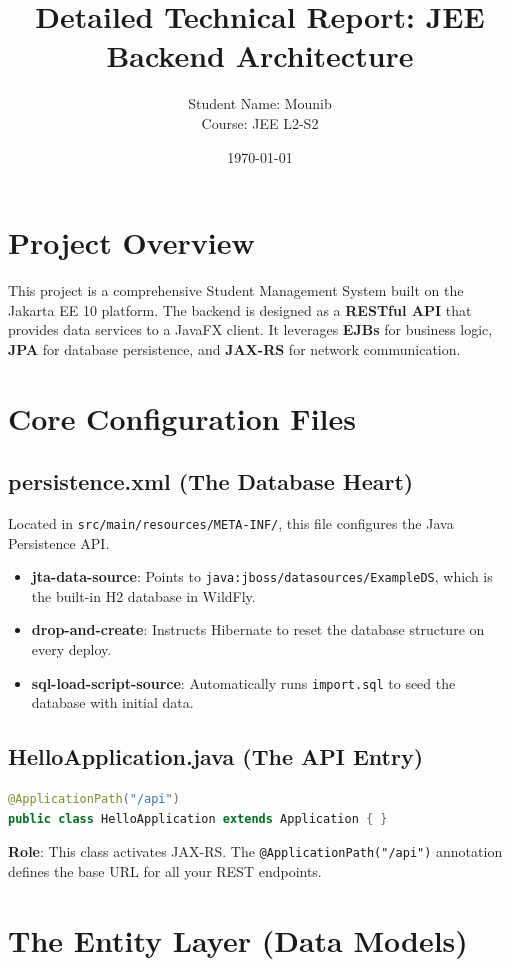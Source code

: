 \documentclass[12pt,a4paper]{article}
\title{\textbf{Detailed Technical Report: JEE Backend Architecture}}
\author{Student Name: Mounib \\ Course: JEE L2-S2}
\date{\today}
\begin{document}
\maketitle
\tableofcontents
\newpage

\section{Project Overview}
This project is a comprehensive Student Management System built on the Jakarta EE 10 platform. The backend is designed as a \textbf{RESTful API} that provides data services to a JavaFX client. It leverages \textbf{EJBs} for business logic, \textbf{JPA} for database persistence, and \textbf{JAX-RS} for network communication.

\section{Core Configuration Files}

\subsection{persistence.xml (The Database Heart)}
Located in \texttt{src/main/resources/META-INF/}, this file configures the Java Persistence API.
\begin{itemize}
    \item \textbf{jta-data-source}: Points to \texttt{java:jboss/datasources/ExampleDS}, which is the built-in H2 database in WildFly.
    \item \textbf{drop-and-create}: Instructs Hibernate to reset the database structure on every deploy.
    \item \textbf{sql-load-script-source}: Automatically runs \texttt{import.sql} to seed the database with initial data.
\end{itemize}

\subsection{HelloApplication.java (The API Entry)}
\begin{lstlisting}[language=Java]
@ApplicationPath("/api")
public class HelloApplication extends Application { }
\end{lstlisting}
\textbf{Role}: This class activates JAX-RS. The \texttt{@ApplicationPath("/api")} annotation defines the base URL for all your REST endpoints.

\section{The Entity Layer (Data Models)}
\end{document}
